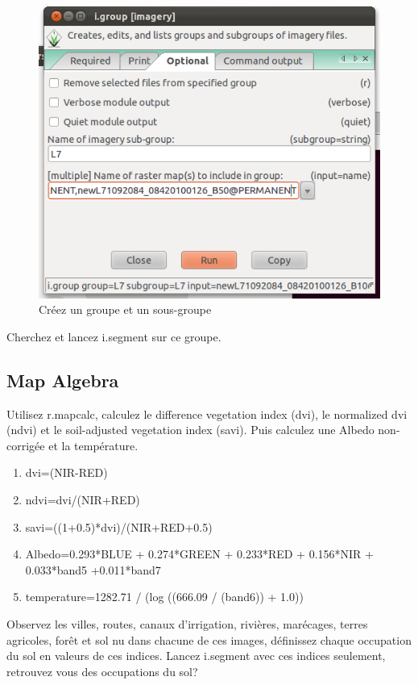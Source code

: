 \begin{figure}[htbp]
   \centering
   \includegraphics[scale=0.55]{grass_rs008.png}
   \caption{Cr\'eez un groupe et un sous-groupe}
   \label{fig:grass_rs008}
\end{figure}

Cherchez et lancez i.segment sur ce groupe.

\subsection{Map Algebra}
\label{map_algebra}

Utilisez r.mapcalc, calculez le difference vegetation index (dvi), le normalized dvi (ndvi) et le soil-adjusted vegetation index (savi). Puis calculez une Albedo non-corrig\'ee et la temp\'erature.

\begin{enumerate}
 \item dvi=(NIR-RED)
 \item ndvi=dvi/(NIR+RED)
 \item savi=((1+0.5)*dvi)/(NIR+RED+0.5)
 \item Albedo=0.293*BLUE + 0.274*GREEN + 0.233*RED + 0.156*NIR + 0.033*band5 +0.011*band7
 \item temperature=1282.71 / (log ((666.09 / (band6)) + 1.0))
\end{enumerate}

Observez les villes, routes, canaux d'irrigation, rivi\`eres, mar\'ecages, terres agricoles, for\^et et sol nu dans chacune de ces images, d\'efinissez chaque occupation du sol en valeurs de ces indices. Lancez i.segment avec ces indices seulement, retrouvez vous des occupations du sol?



